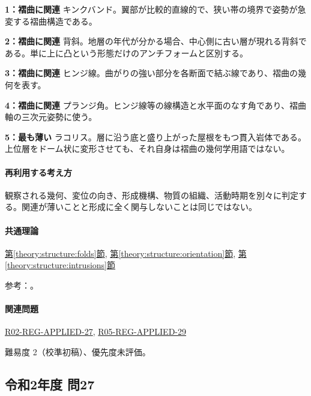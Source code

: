 \noindent\textbf{1：褶曲に関連} キンクバンド。翼部が比較的直線的で、狭い帯の境界で姿勢が急変する褶曲構造である。\par

\noindent\textbf{2：褶曲に関連} 背斜。地層の年代が分かる場合、中心側に古い層が現れる背斜である。単に上に凸という形態だけのアンチフォームと区別する。\par

\noindent\textbf{3：褶曲に関連} ヒンジ線。曲がりの強い部分を各断面で結ぶ線であり、褶曲の幾何を表す。\par

\noindent\textbf{4：褶曲に関連} プランジ角。ヒンジ線等の線構造と水平面のなす角であり、褶曲軸の三次元姿勢に使う。\par

\noindent\textbf{5：最も薄い} ラコリス。層に沿う底と盛り上がった屋根をもつ貫入岩体である。上位層をドーム状に変形させても、それ自身は褶曲の幾何学用語ではない。\par

\paragraph{再利用する考え方} 観察される幾何、変位の向き、形成機構、物質の組織、活動時期を別々に判定する。関連が薄いことと形成に全く関与しないことは同じではない。

\paragraph{共通理論} \hyperref[theory:structure:folds]{第\ref*{theory:structure:folds}節}, \hyperref[theory:structure:orientation]{第\ref*{theory:structure:orientation}節}, \hyperref[theory:structure:intrusions]{第\ref*{theory:structure:intrusions}節}

\par 参考：\cite{str_intrusion,str_fold}。

\paragraph{関連問題} \hyperref[q:r02-reg-applied-27]{R02-REG-APPLIED-27}, \hyperref[q:r05-reg-applied-29]{R05-REG-APPLIED-29}

\par 難易度 2（校準初稿）、優先度未評価。

\subsection{令和2年度 問27}
\label{q:r02-reg-applied-27}

